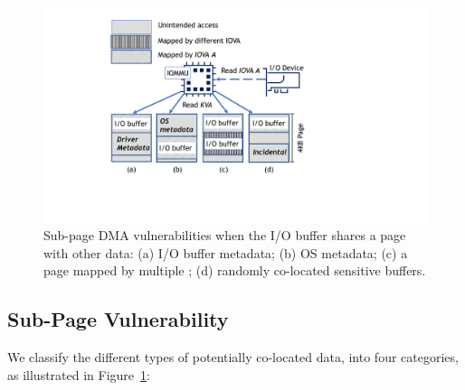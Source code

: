 \begin{figure}[t]
    \centering
    \includegraphics[width=1\columnwidth]{figs/subpage.pdf}
    \caption{Sub-page DMA vulnerabilities when the I/O buffer shares a page with other data: (a) I/O buffer metadata; (b) OS
metadata; (c) a page mapped by multiple \iova; (d) randomly co-located sensitive buffers.}
    \label{fig:colocation}
\end{figure}

\subsection{Sub-Page Vulnerability}\label{sec:subpage}

We classify the different types of potentially co-located data, into four categories, as illustrated in Figure~\ref{fig:colocation}:

